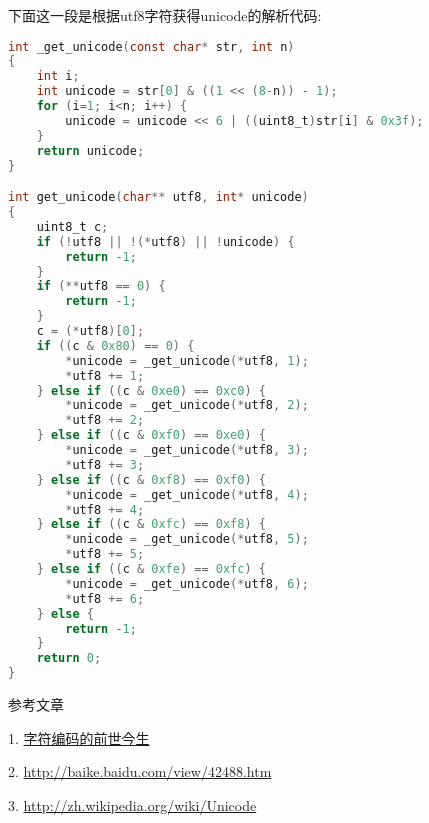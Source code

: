 {\begin{itemize}
{        {下面这一段是根据utf8字符获得unicode的解析代码:}\par
\begin{lstlisting}[language=C]
int _get_unicode(const char* str, int n)
{
    int i;
    int unicode = str[0] & ((1 << (8-n)) - 1);
    for (i=1; i<n; i++) {
        unicode = unicode << 6 | ((uint8_t)str[i] & 0x3f);
    }
    return unicode;
}

int get_unicode(char** utf8, int* unicode)
{
    uint8_t c;
    if (!utf8 || !(*utf8) || !unicode) {
        return -1;
    }
    if (**utf8 == 0) {
        return -1;
    }
    c = (*utf8)[0];
    if ((c & 0x80) == 0) {
        *unicode = _get_unicode(*utf8, 1);
        *utf8 += 1;
    } else if ((c & 0xe0) == 0xc0) {
        *unicode = _get_unicode(*utf8, 2);
        *utf8 += 2;
    } else if ((c & 0xf0) == 0xe0) {
        *unicode = _get_unicode(*utf8, 3);
        *utf8 += 3;
    } else if ((c & 0xf8) == 0xf0) {
        *unicode = _get_unicode(*utf8, 4);
        *utf8 += 4;
    } else if ((c & 0xfc) == 0xf8) {
        *unicode = _get_unicode(*utf8, 5);
        *utf8 += 5;
    } else if ((c & 0xfe) == 0xfc) {
        *unicode = _get_unicode(*utf8, 6);
        *utf8 += 6;
    } else {
        return -1;
    }
    return 0;
}
\end{lstlisting}
    }
    \end{itemize}
}

{\ZHH 参考文章}\par
{1. \href{http://djt.qq.com/article/view/658?ADTAG=email.InnerAD.weekly.20130902}{字符编码的前世今生}}\par
{2. \href{http://baike.baidu.com/view/42488.htm}{http://baike.baidu.com/view/42488.htm}}\par
{3. \href{http://zh.wikipedia.org/wiki/Unicode}{http://zh.wikipedia.org/wiki/Unicode}}\par


